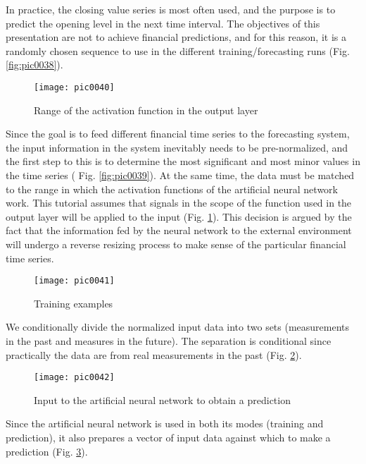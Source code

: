 In practice, the closing value series is most often used, and the purpose is to predict the opening level in the next time interval. The objectives of this presentation are not to achieve financial predictions, and for this reason, it is a randomly chosen sequence to use in the different training/forecasting runs (Fig. \ref{fig:pic0038}).

\begin{figure}[h]
\centering
\texttt{[image: pic0040]}
\caption{Range of the activation function in the output layer}
\label{fig:pic0040}
\end{figure}
\FloatBarrier

Since the goal is to feed different financial time series to the forecasting system, the input information in the system inevitably needs to be pre-normalized, and the first step to this is to determine the most significant and most minor values in the time series ( Fig. \ref{fig:pic0039}). At the same time, the data must be matched to the range in which the activation functions of the artificial neural network work. This tutorial assumes that signals in the scope of the function used in the output layer will be applied to the input (Fig. \ref{fig:pic0040}). This decision is argued by the fact that the information fed by the neural network to the external environment will undergo a reverse resizing process to make sense of the particular financial time series.

\begin{figure}[h]
\centering
\texttt{[image: pic0041]}
\caption{Training examples}
\label{fig:pic0041}
\end{figure}
\FloatBarrier

We conditionally divide the normalized input data into two sets (measurements in the past and measures in the future). The separation is conditional since practically the data are from real measurements in the past (Fig. \ref{fig:pic0041}).

\begin{figure}[h]
\centering
\texttt{[image: pic0042]}
\caption{Input to the artificial neural network to obtain a prediction}
\label{fig:pic0042}
\end{figure}
\FloatBarrier

Since the artificial neural network is used in both its modes (training and prediction), it also prepares a vector of input data against which to make a prediction (Fig. \ref{fig:pic0042}).

